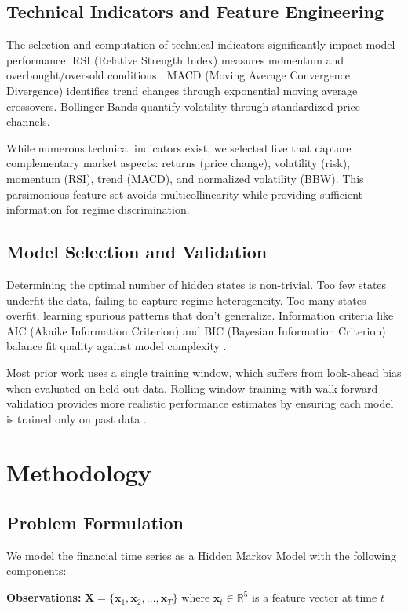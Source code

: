 \documentclass[conference]{IEEEtran}
\begin{document}
\subsection{Technical Indicators and Feature Engineering}
The selection and computation of technical indicators significantly impact model performance. RSI (Relative Strength Index) measures momentum and overbought/oversold conditions \cite{wilder1978}. MACD (Moving Average Convergence Divergence) identifies trend changes through exponential moving average crossovers. Bollinger Bands quantify volatility through standardized price channels.

While numerous technical indicators exist, we selected five that capture complementary market aspects: returns (price change), volatility (risk), momentum (RSI), trend (MACD), and normalized volatility (BBW). This parsimonious feature set avoids multicollinearity while providing sufficient information for regime discrimination.

\subsection{Model Selection and Validation}
Determining the optimal number of hidden states is non-trivial. Too few states underfit the data, failing to capture regime heterogeneity. Too many states overfit, learning spurious patterns that don't generalize. Information criteria like AIC (Akaike Information Criterion) and BIC (Bayesian Information Criterion) balance fit quality against model complexity \cite{akaike1974, schwarz1978}.

Most prior work uses a single training window, which suffers from look-ahead bias when evaluated on held-out data. Rolling window training with walk-forward validation provides more realistic performance estimates by ensuring each model is trained only on past data \cite{pardo2011}.

\section{Methodology}

\subsection{Problem Formulation}
We model the financial time series as a Hidden Markov Model with the following components:

\textbf{Observations:} $\mathbf{X} = \{\mathbf{x}_1, \mathbf{x}_2, \ldots, \mathbf{x}_T\}$ where $\mathbf{x}_t \in \mathbb{R}^5$ is a feature vector at time $t$
\end{document}
